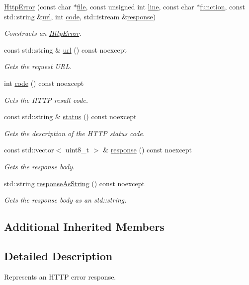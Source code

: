 \begin{DoxyCompactItemize}
\hyperlink{group___network_module_ga45854282cc688af939cbe7d7242661a3}{Http\+Error} (const char $\ast$\hyperlink{group___utility_module_ga0b75e32780cb8534179ff3c060739496}{file}, const unsigned int \hyperlink{group___utility_module_ga13437b5caffe754b7a32fc3c514907e5}{line}, const char $\ast$\hyperlink{group___utility_module_gaa69c98222c56544a9094154a8eab4db9}{function}, const std\+::string \&\hyperlink{group___network_module_ga979dcee6ab51c4f6be456ae242c8f90b}{url}, int \hyperlink{group___network_module_ga7dcace94fa3fc37b1f0f6881438c6446}{code}, std\+::istream \&\hyperlink{group___network_module_gac1cbcd7696b0048a61231953d2aad0d7}{response})
\begin{DoxyCompactList}\small\item\em Constructs an \hyperlink{classdg_1_1deepcore_1_1network_1_1_http_error}{Http\+Error}. \end{DoxyCompactList}\item 
const std\+::string \& \hyperlink{group___network_module_ga979dcee6ab51c4f6be456ae242c8f90b}{url} () const noexcept
\begin{DoxyCompactList}\small\item\em Gets the request U\+RL. \end{DoxyCompactList}\item 
int \hyperlink{group___network_module_ga7dcace94fa3fc37b1f0f6881438c6446}{code} () const noexcept
\begin{DoxyCompactList}\small\item\em Gets the H\+T\+TP result code. \end{DoxyCompactList}\item 
const std\+::string \& \hyperlink{group___network_module_gadaf5c8fe0e843d50fa5f55a83f6bb0d6}{status} () const noexcept
\begin{DoxyCompactList}\small\item\em Gets the description of the H\+T\+TP status code. \end{DoxyCompactList}\item 
const std\+::vector$<$ uint8\+\_\+t $>$ \& \hyperlink{group___network_module_gac1cbcd7696b0048a61231953d2aad0d7}{response} () const noexcept
\begin{DoxyCompactList}\small\item\em Gets the response body. \end{DoxyCompactList}\item 
std\+::string \hyperlink{group___network_module_ga0768820112e9c0d089a04b9d98bb5bf2}{response\+As\+String} () const noexcept
\begin{DoxyCompactList}\small\item\em Gets the response body as an std\+::string. \end{DoxyCompactList}\end{DoxyCompactItemize}
\subsection*{Additional Inherited Members}


\subsection{Detailed Description}
Represents an H\+T\+TP error response. 